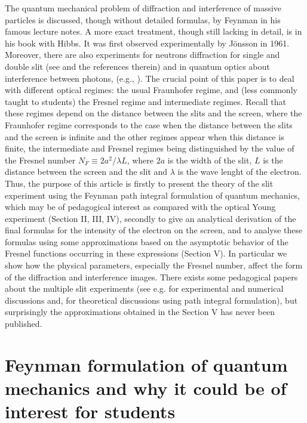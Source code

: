 \documentclass[12pt,aps,prb,preprint]{revtex4-1}   %
\begin{document}
The quantum mechanical problem of diffraction and interference of
massive particles is discussed, though without detailed formulas,
by Feynman in his famous lecture notes.\cite{Feynman} A more
exact treatment, though still lacking in detail, is in his book
with Hibbs.\cite{FH} It was first observed experimentally by
J\"onsson in 1961.\cite{Jonsson} Moreover, there are also
experiments for neutrons diffraction for single and double slit 
(see \cite{Zeilinger} and the references therein)
and in quantum optics about interference between photons,
(e.g., \cite{Mandel}).  
The crucial point of this paper is to deal with different optical regimes: the usual
Fraunhofer regime, and (less commonly taught to students) the
Fresnel regime and intermediate regimes. 
Recall that these regimes depend on the distance between the slits and
the screen, where the Fraunhofer regime corresponds to the case
when the distance between the slits and the screen is infinite and
the other regimes appear when this distance is finite, the
intermediate and Fresnel regimes being distinguished by the value
of the Fresnel number $N_F\equiv 2a^2/\lambda L$, where $2a$ is the
width of the slit, $L$ is the distance between the screen and
the slit and $\lambda$ is the wave lenght of the electron. 
Thus, the purpose of this article is firstly to present the theory of the slit experiment
using the Feynman path integral formulation of quantum mechanics,
which may be of pedagogical interest as compared with the optical
Young experiment (Section II, III, IV), secondly to give an analytical
derivation of the final formulas for the intensity of the electron
on the screen, and to analyse these formulas using some
approximations based on the asymptotic behavior of the Fresnel
functions \cite{Abramowitz} occurring in these expressions (Section V). 
In particular we show how the physical parameters, especially the
Fresnel number, affect the form of the diffraction and
interference images. There exists some pedagogical papers 
about the multiple slit experiments 
(see e.g. \cite{Frabboni} for experimental and numerical discussions
and, \cite{Barut} for theoretical discussions using path integral formulation),
but surprisingly the approximations obtained in the Section V has never been published.




\section{Feynman formulation of quantum mechanics and why it could be of interest for students}
\end{document}
